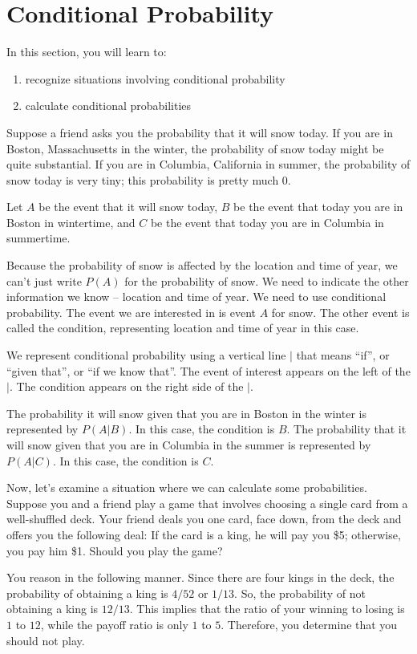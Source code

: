 \section{Conditional Probability}
In this section, you will learn to:
\begin{enumerate}
    \item recognize situations involving conditional probability
    \item calculate conditional probabilities
\end{enumerate}

Suppose a friend asks you the probability that it will snow today. If you are in Boston, Massachusetts in the winter, the probability of snow today might be quite substantial. If you are in Columbia, California in summer, the probability of snow today is very tiny; this probability is pretty much 0.

Let $A$ be the event that it will snow today, $B$ be the event that today you are in Boston in wintertime, and $C$ be the event that today you are in Columbia in summertime.

Because the probability of snow is affected by the location and time of year, we can’t just write $P(A)$ for the probability of snow. We need to indicate the other information we know – location and time of year. We need to use conditional probability. The event we are interested in is event $A$ for snow. The other event is called the condition, representing location and time of year in this case.

We represent conditional probability using a vertical line $|$ that means “if”, or “given that”, or “if we know that”. The event of interest appears on the left of the $|$. The condition appears on the right side of the $|$.

The probability it will snow given that you are in Boston in the winter is represented by $P(A|B)$. In this case, the condition is $B$.
The probability that it will snow given that you are in Columbia in the summer is represented by $P(A|C)$. In this case, the condition is $C$.

Now, let’s examine a situation where we can calculate some probabilities. Suppose you and a friend play a game that involves choosing a single card from a well-shuffled deck. Your friend deals you one card, face down, from the deck and offers you the following deal: If the card is a king, he will pay you \$5; otherwise, you pay him \$1. Should you play the game?

You reason in the following manner. Since there are four kings in the deck, the probability of obtaining a king is $4/52$ or $1/13$. So, the probability of not obtaining a king is $12/13$. This implies that the ratio of your winning to losing is $1$ to $12$, while the payoff ratio is only $1$ to $5$. Therefore, you determine that you should not play.

